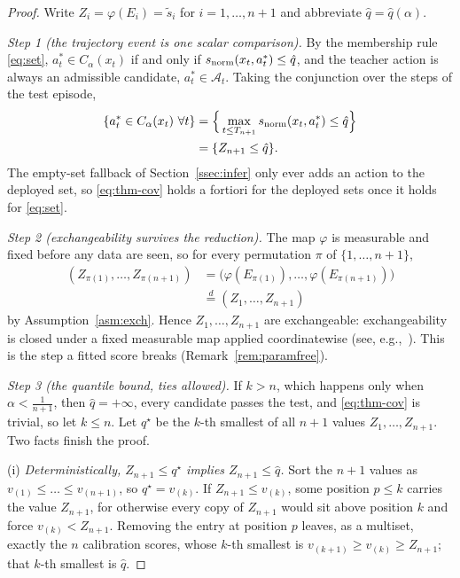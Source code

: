 \begin{proof}
Write $Z_i=\varphi(E_i)=\tilde s_i$ for $i=1,\dots,n+1$ and abbreviate
$\hat q=\hat q(\alpha)$.

\emph{Step 1 (the trajectory event is one scalar comparison).}
By the membership rule \eqref{eq:set}, $a^*_t\in C_\alpha(x_t)$ if and only if
$s_{\mathrm{norm}}(x_t,a^*_t)\leq\hat q$, and the teacher action is always an admissible
candidate, $a^*_t\in\mathcal A_t$. Taking the conjunction over the steps of
the test episode,
\begin{equation}
\begin{split}
\{a^*_t\in C_\alpha(x_t)\ \forall t\}
&=\Big\{\max_{t\leq T_{n+1}}s_{\mathrm{norm}}(x_t,a^*_t)\leq\hat q\Big\}\\
&=\{Z_{n+1}\leq\hat q\}.
\end{split}
\label{eq:event}
\end{equation}
The empty-set fallback of Section~\ref{ssec:infer} only ever adds an action to
the deployed set, so \eqref{eq:thm-cov} holds a fortiori for the deployed
sets once it holds for \eqref{eq:set}.

\emph{Step 2 (exchangeability survives the reduction).}
The map $\varphi$ is measurable and fixed before any data are seen, so for
every permutation $\pi$ of $\{1,\dots,n+1\}$,
\begin{align*}
(Z_{\pi(1)},\dots,Z_{\pi(n+1)})
&=\big(\varphi(E_{\pi(1)}),\dots,\varphi(E_{\pi(n+1)})\big)\\
&\overset{d}{=}(Z_1,\dots,Z_{n+1})
\end{align*}
by Assumption~\ref{asm:exch}. Hence $Z_1,\dots,Z_{n+1}$ are exchangeable:
exchangeability is closed under a fixed measurable map applied
coordinatewise (see, e.g.,~\cite{kallenberg2005symmetries}). This is the
step a fitted score breaks (Remark~\ref{rem:paramfree}).

\emph{Step 3 (the quantile bound, ties allowed).}
If $k>n$, which happens only when $\alpha<\tfrac{1}{n+1}$, then
$\hat q=+\infty$, every candidate passes the test, and \eqref{eq:thm-cov} is
trivial, so let $k\leq n$. Let $q^\star$ be the $k$-th smallest of all $n+1$
values $Z_1,\dots,Z_{n+1}$. Two facts finish the proof.

(i) \emph{Deterministically, $Z_{n+1}\leq q^\star$ implies
$Z_{n+1}\leq\hat q$.} Sort the $n+1$ values as
$v_{(1)}\leq\dots\leq v_{(n+1)}$, so $q^\star=v_{(k)}$. If
$Z_{n+1}\leq v_{(k)}$, some position $p\leq k$ carries the value $Z_{n+1}$,
for otherwise every copy of $Z_{n+1}$ would sit above position $k$ and
force $v_{(k)}<Z_{n+1}$. Removing the entry at position $p$ leaves, as a
multiset, exactly the $n$ calibration scores, whose $k$-th smallest is
$v_{(k+1)}\geq v_{(k)}\geq Z_{n+1}$; that $k$-th smallest is $\hat q$.


\end{proof}
